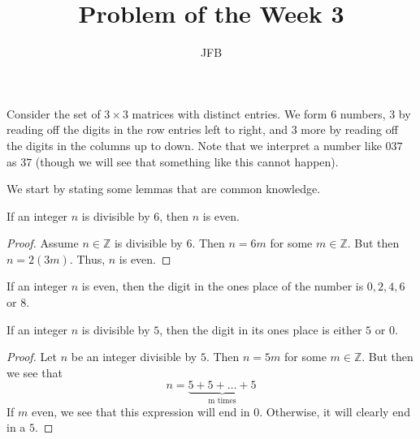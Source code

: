 \documentclass[12pt]{article}
\newcommand{\Z}{\mathbb{Z}}
\newenvironment{lemma}[2][Lemma]{\begin{trivlist}
\item[\hskip \labelsep {\bfseries #1}\hskip \labelsep {\bfseries #2.}]}{\end{trivlist}}
\begin{document}
 
 
 
\title{Problem of the Week 3}%
\author{JFB} %
 
\maketitle
Consider the set of $3\times 3$ matrices with distinct entries. We form $6$ numbers, $3$ by reading off the digits in the row entries left to right, and $3$ more by reading off the digits in the columns up to down. Note that we interpret a number like $037$ as $37$ (though we will see that something like this cannot happen).

We start by stating some lemmas that are common knowledge. 
\begin{lemma}{1}
If an integer $n$ is divisible by $6$, then $n$ is even.
\end{lemma}
\begin{proof}
Assume $n \in \Z$ is divisible by $6$. Then $n = 6m$ for some $m \in \Z$. But then $n = 2(3m)$. Thus, $n$ is even. 

\end{proof}
\begin{lemma}{2}
If an integer $n$ is even, then the digit in the ones place of the number is $0,2,4,6$ or $8$.
\end{lemma}

\begin{lemma}{3}
If an integer $n$ is divisible by $5$, then the digit in its ones place is either $5$ or $0$. 
\end{lemma}
\begin{proof}
Let $n$ be an integer divisible by $5$. Then $n = 5m$ for some $m \in \Z$. But then we see that 
$$
n = \underbrace{5 + 5 + \dots + 5}_{\text{m times}}
$$
If $m$ even, we see that this expression will end in $0$. Otherwise, it will clearly end in a $5$.

\end{proof}
\end{document}

